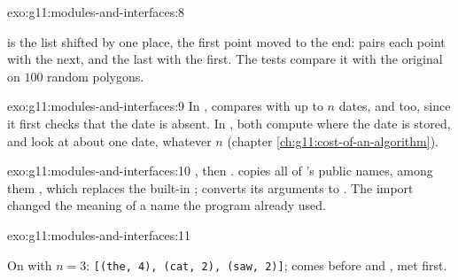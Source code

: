 \begin{solution}{exo:g11:modules-and-interfaces:8}
\smallskip\noindent\hspace*{2em}

\noindent\hspace*{4em}

\noindent\hspace*{4em}

\smallskip\noindent {} is the list shifted by one place, the first point moved to the end:
 pairs each point with the next, and the last with the first. The tests compare it with the original on
$100$ random polygons.
\end{solution}

\begin{solution}{exo:g11:modules-and-interfaces:9}
In ,  compares with up to $n$ dates, and  too, since it first checks that
the date is absent. In , both compute where the date is stored, and look at about one date,
whatever $n$ (chapter \ref{ch:g11:cost-of-an-algorithm}).
\end{solution}

\begin{solution}{exo:g11:modules-and-interfaces:10}
, then .  copies all of 's public names, among them
, which replaces the built-in ;  converts its arguments to . The
import changed the meaning of a name the program already used.
\end{solution}

\begin{solution}{exo:g11:modules-and-interfaces:11}
\smallskip\noindent\hspace*{2em}

\noindent\hspace*{4em}

\noindent\hspace*{4em}

\smallskip\noindent On  with $n = 3$:
\texttt{[(\textquotesingle{}the\textquotesingle{}, 4), (\textquotesingle{}cat\textquotesingle{}, 2), (\textquotesingle{}saw\textquotesingle{}, 2)]};  comes before  and , met first.
\end{solution}

